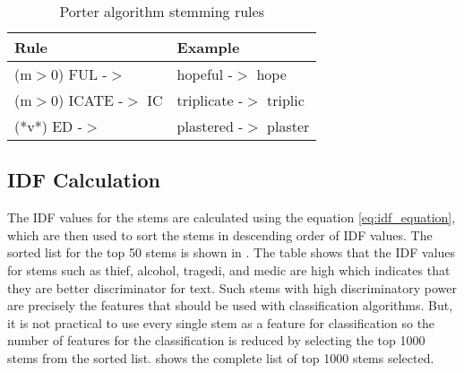 \begin{table}
    \centering
    \caption{Porter algorithm stemming rules}
    \label{tbl:porter_algo}
    \begin{tabular}{p{4cm}p{4cm}}
    \toprule
    Rule&Example \\
    \midrule
    (m$>$0) FUL -$>$  &  hopeful -$>$ hope \\
    (m$>$0) ICATE -$>$ IC  & triplicate -$>$ triplic \\
    (*v*) ED -$>$ & plastered -$>$ plaster \\
    \bottomrule
    \end{tabular}
\end{table}

\subsection{IDF Calculation}
The IDF values for the stems are calculated using the equation \eqref{eq:idf_equation}, which are then used to sort the stems in descending order of IDF values. The sorted list for the top 50 stems is shown in . The table shows that the IDF values for stems such as thief, alcohol, tragedi, and medic are high which indicates that they are better discriminator for text. Such stems with high discriminatory power are precisely the features that should be used with classification algorithms. But, it is not practical to use every single stem as a feature for classification so the number of features for the classification is reduced by selecting the top 1000 stems from the sorted list.  shows the complete list of top 1000 stems selected.

